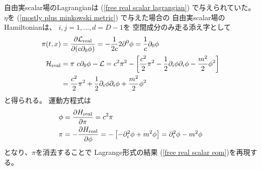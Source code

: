 自由実scalar場のLagrangianは
(\ref{free real scalar lagrangian})
で与えられていた。
$\eta$を
(\ref{mostly plus minkowski metric})
で与えた場合の
自由実scalar場のHamiltonianは、
$i, j = 1, \dots, d = D-1$を
空間成分のみ走る添え字として
\begin{subequations}
\begin{align}
    \pi(t, \bm{x})
&=
    \dfrac{ \partial \mathcal{L}_{\rm real} }
        { \partial( c \partial_0 \phi) }
=
    - \dfrac{1}{2 c}
        2 \partial^0 \phi
=   \dfrac{1}{c}
    \partial_0 \phi
\\
    \mathcal{H}_{\rm real}
&=
    \pi\ 
        c
        \partial_0 \phi
    -
    \mathcal{L}
=
    c^2 \pi^2
    -
    \left[
        \dfrac{ c^2 }{2}
            \pi^2
        -
        \dfrac{ 1 }{2}
            \partial_i \phi
            \partial_i \phi
        -
        \dfrac{m^2}{2} \phi^2
    \right]
\notag\\&
=
    \dfrac{ c^2 }{2} \pi^2
    +
        \dfrac{ 1 }{2}
            \partial_i \phi
            \partial_i \phi
    +
        \dfrac{m^2}{2} \phi^2
\end{align}
\end{subequations}
と得られる。
運動方程式は
\begin{subequations}
\begin{align}
    \dot{\phi}
&=
    \dfrac{
        \partial H_{\rm real}
    }{ \partial \pi}
=
    c^2 \pi
\\
    \dot{\pi}
&=
    -
    \dfrac{
        \partial H_{\rm real}
    }{ \partial \phi}
=
    - \left[
    -
        \partial_i^2 \phi
    +
        m^2 \phi
    \right]
=
        \partial_i^2 \phi
    -
        m^2 \phi
\end{align}
\end{subequations}
となり、$\pi$を消去することで
Lagrange形式の結果
(\ref{free real scalar eom})を再現する。

